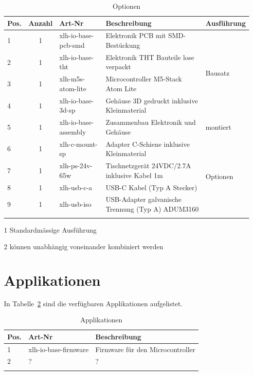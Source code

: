 \documentclass[10pt]{datasheet}
\begin{document}
\begin{table}[h]
\begin{threeparttable}
\caption{Optionen \xlhPlattformID}
    \begin{tabularx}{\textwidth}{l | c | l | l | X}

        \thickhline
        \textbf{Pos.} & \textbf{Anzahl} & \textbf{Art-Nr} & \textbf{Beschreibung} & \textbf{Ausführung} \\
        \hline
        1 & 1 & xlh-io-base-pcb-smd & Elektronik PCB mit SMD-Bestückung & \multirow{4}{*}{Bausatz\tnote{1}}  \\
        2 & 1 & xlh-io-base-tht & Elektronik THT Bauteile lose verpackt &  \\
        3 & 1 & xlh-m5s-atom-lite & Microcontroller M5-Stack Atom Lite & \\
        4 & 1 & xlh-io-base-3d-sp & Gehäuse 3D gedruckt inklusive Kleinmaterial & \\
        \hline
        5 & 1 & xlh-io-base-assembly & Zusammenbau Elektronik und Gehäuse & montiert \\
        \hline
        6 & 1 & xlh-c-mount-sp & Adapter C-Schiene inklusive Kleinmaterial & \multirow{4}{*}{Optionen\tnote{2}} \\
        7 & 1 & xlh-ps-24v-65w & Tischnetzgerät 24VDC/2.7A inklusive Kabel 1m &  \\
        8 & 1 & xlh-usb-c-a & USB-C Kabel (Typ A Stecker) &  \\
        9 & 1 & xlh-usb-iso & USB-Adapter galvanische Trennung (Typ A) ADUM3160 &  \\
        \thickhline
    \end{tabularx}
\begin{tablenotes}
\item[1]{Standardmässige Ausführung}
\item[2]{können unabhängig voneinander kombiniert werden}
\end{tablenotes}
\label{tab:optionen}
\end{threeparttable}
\end{table}

\section{Applikationen}
In Tabelle~\ref{tab:applikationen} sind die verfügbaren Applikationen aufgelistet.

\begin{table}[h]
\begin{threeparttable}
\caption{Applikationen \xlhPlattformID}
    \begin{tabularx}{\textwidth}{l | l | l }
        \thickhline
        \textbf{Pos.} & \textbf{Art-Nr} & \textbf{Beschreibung} \\
        \hline
        1 & xlh-io-base-firmware & Firmware für den Microcontroller \\
        2 & ? & ?  \\
        \thickhline
    \end{tabularx}

\label{tab:applikationen}
\end{threeparttable}
\end{table}
\end{document}
